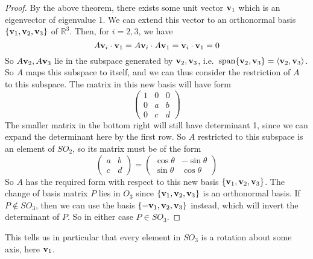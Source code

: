 \begin{proof}
	By the above theorem, there exists some unit vector \(\vb v_1\) which is an eigenvector of eigenvalue 1.
	We can extend this vector to an orthonormal basis \(\{ \vb v_1, \vb v_2, \vb v_3 \}\) of \(\mathbb R^3\).
	Then, for \(i=2,3\), we have
	\[
		A\vb v_i \cdot \vb v_1 = A\vb v_i \cdot A\vb v_1 = \vb v_i \cdot \vb v_1 = 0
	\]
	So \(A\vb v_2, A\vb v_3\) lie in the subspace generated by \(\vb v_2, \vb v_3\), i.e.\ \(\operatorname{span} \{ \vb v_2, \vb v_3 \} = \langle{} \vb v_2, \vb v_3 \rangle\).
	So \(A\) maps this subspace to itself, and we can thus consider the restriction of \(A\) to this subspace.
	The matrix in this new basis will have form
	\[
		\begin{pmatrix}
			1 & 0 & 0 \\
			0 & a & b \\
			0 & c & d
		\end{pmatrix}
	\]
	The smaller matrix in the bottom right will still have determinant 1, since we can expand the determinant here by the first row.
	So \(A\) restricted to this subspace is an element of \(SO_2\), so its matrix must be of the form
	\[
		\begin{pmatrix}
			a & b \\ c & d
		\end{pmatrix} = \begin{pmatrix}
			\cos \theta & -\sin \theta \\
			\sin \theta & \cos \theta
		\end{pmatrix}
	\]
	So \(A\) has the required form with respect to this new basis \(\{ \vb v_1, \vb v_2, \vb v_3 \}\).
	The change of basis matrix \(P\) lies in \(O_3\) since \(\{ \vb v_1, \vb v_2, \vb v_3 \}\) is an orthonormal basis.
	If \(P \notin SO_3\), then we can use the basis \(\{ -\vb v_1, \vb v_2, \vb v_3 \}\) instead, which will invert the determinant of \(P\).
	So in either case \(P \in SO_3\).
\end{proof}
This tells us in particular that every element in \(SO_3\) is a rotation about some axis, here \(\vb v_1\).

